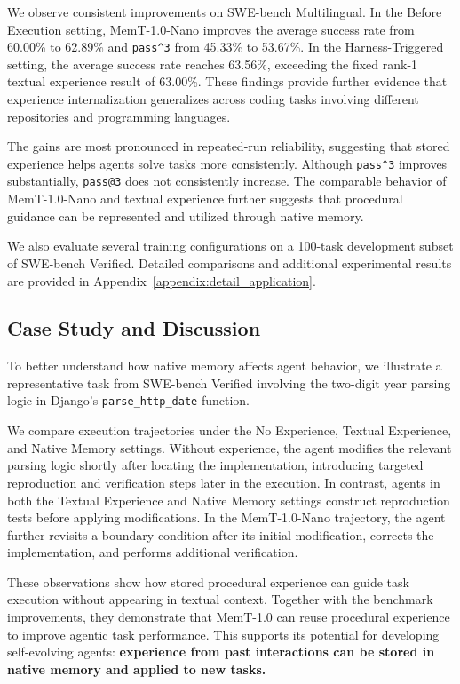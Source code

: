 We observe consistent improvements on SWE-bench Multilingual. In the Before Execution setting, MemT-1.0-Nano improves the average success rate from 60.00\% to 62.89\% and \texttt{pass\textasciicircum{}3} from 45.33\% to 53.67\%. In the Harness-Triggered setting, the average success rate reaches 63.56\%, exceeding the fixed rank-1 textual experience result of 63.00\%. These findings provide further evidence that experience internalization generalizes across coding tasks involving different repositories and programming languages.

The gains are most pronounced in repeated-run reliability, suggesting that stored experience helps agents solve tasks more consistently. Although \texttt{pass\textasciicircum{}3} improves substantially, \texttt{pass@3} does not consistently increase.
The comparable behavior of MemT-1.0-Nano and textual experience further suggests that procedural guidance can be represented and utilized through native memory.


We also evaluate several training configurations on a 100-task development subset of SWE-bench Verified. Detailed comparisons and additional experimental results are provided in Appendix~\ref{appendix:detail_application}.


\subsection{Case Study and Discussion}
\label{sec:app-discussion}

To better understand how native memory affects agent behavior, we illustrate a representative task from SWE-bench Verified involving the two-digit year parsing logic in Django's \texttt{parse\_http\_date} function. 

We compare execution trajectories under the No Experience, Textual Experience, and Native Memory settings. Without experience, the agent modifies the relevant parsing logic shortly after locating the implementation, introducing targeted reproduction and verification steps later in the execution. In contrast, agents in both the Textual Experience and Native Memory settings construct reproduction tests before applying modifications. In the MemT-1.0-Nano trajectory, the agent further revisits a boundary condition after its initial modification, corrects the implementation, and performs additional verification.

These observations show how stored procedural experience can guide task execution without appearing in textual context. Together with the benchmark improvements, they demonstrate that MemT-1.0 can reuse procedural experience to improve agentic task performance. This supports its potential for developing self-evolving agents: \textbf{experience from past interactions can be stored in native memory and applied to new tasks.}

